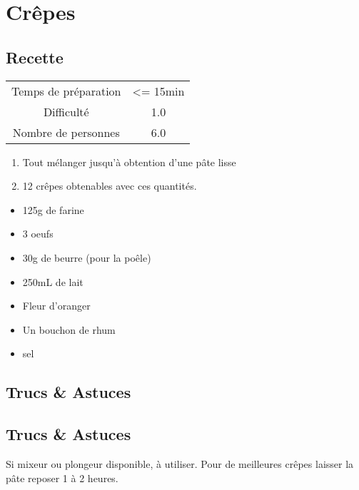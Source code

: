 \newpage
\section{Crêpes}
    \label{sec:Crêpes}
    \subsection{Recette}
    \vspace{1cm}


    \begin{center}
        \begin{tabular}{c|c}
            Temps de préparation & <= 15min \\
            Difficulté & 1.0 \\
            Nombre de personnes & 6.0 
        \end{tabular}
    \end{center}{}

    \vspace{1cm}
    \hline
    \vspace{1cm}

    \begin{minipage}{.7\textwidth}
        \begin{enumerate}
            \item Tout mélanger jusqu'à obtention d'une pâte lisse
	    \item 12 crêpes obtenables avec ces quantités.

        \end{enumerate}
    \end{minipage}
    \begin{minipage}{.3\textwidth}
        \begin{flushleft}
        \begin{itemize}
            \item 125g de farine
	    \item 3 oeufs
	    \item 30g de beurre (pour la poêle)
	    \item 250mL de lait
	    \item Fleur d'oranger
	    \item Un bouchon de rhum
	    \item sel

        \end{itemize}
        \end{flushleft}
    \end{minipage}
    
    \vspace{1cm}
    \hline
    \vspace{1cm}
    
    \subsection{Trucs \& Astuces}
        \subsection{Trucs \& Astuces}
	Si mixeur ou plongeur disponible, à utiliser. Pour de meilleures crêpes laisser la pâte reposer 1 à 2 heures.
